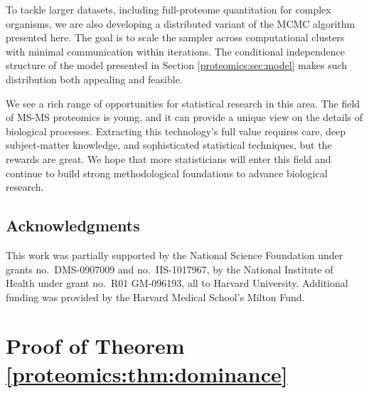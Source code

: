 To tackle larger datasets, including full-proteome quantitation for complex organisms, we are also developing a distributed variant of the MCMC algorithm presented here.
The goal is to scale the sampler across computational clusters with minimal communication within iterations.
The conditional independence structure of the model presented in Section \ref{proteomics:sec:model} makes such distribution both appealing and feasible.

We see a rich range of opportunities for statistical research in this area.
The field of MS-MS proteomics is young, and it can provide a unique view on the details of biological processes.
Extracting this technology's full value requires care, deep subject-matter knowledge, and sophisticated statistical techniques, but the rewards are great.
We hope that more statisticians will enter this field and continue to build strong methodological foundations to advance biological research.


\subsection*{Acknowledgments}

This work was partially supported by the National Science Foundation under grants no.\ DMS-0907009 and no.\ IIS-1017967, by the National Institute of Health under grant no.\ R01 GM-096193, all to Harvard University. Additional funding was provided by the Harvard Medical School's Milton Fund.



\section{Proof of Theorem \ref{proteomics:thm:dominance}}

